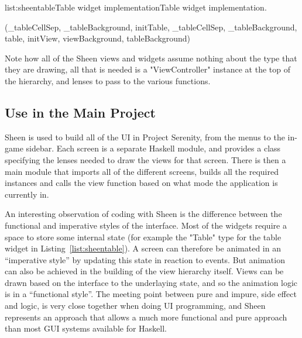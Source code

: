 \vspace{-0.5em}
\begin{listing}{list:sheentable}{Table widget implementation}{Table widget implementation.}{}
\end{listing}\vspace{-1.5em}

\functions(_tableCellSep, _tableBackground, initTable, _tableCellSep, _tableBackground, table, initView, viewBackground, tableBackground)
\noindent 
Note how all of the Sheen views and widgets assume nothing about the type that they are drawing, all that is needed is a "ViewController" instance at the top of the hierarchy, and lenses to pass to the various functions. 

\subsection{Use in the Main Project}

Sheen is used to build all of the UI in Project Serenity, from the menus to the in-game sidebar. Each screen is a separate Haskell module, and provides a class specifying the lenses needed to draw the views for that screen. There is then a main module that imports all of the different screens, builds all the required instances and calls the view function based on what mode the application is currently in.

An interesting observation of coding with Sheen is the difference between the functional and imperative styles of the interface. Most of the widgets require a space to store some internal state (for example the "Table" type for the table widget in Listing~\ref{list:sheentable}). A screen can therefore be animated in an ``imperative style'' by updating this state in reaction to events. But animation can also be achieved in the building of the view hierarchy itself. Views can be drawn based on the interface to the underlaying state, and so the animation logic is in a ``functional style''. The meeting point between pure and impure, side effect and logic, is very close together when doing UI programming, and Sheen represents an approach that allows a much more functional and pure approach than most GUI systems available for Haskell.

